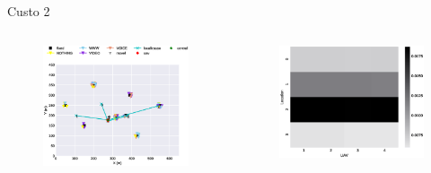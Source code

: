 \begin{frame}{Custo 2}
        \begin{columns}
            \begin{column}{0.65\textwidth}
               \begin{figure}[!htb]
                    \includegraphics[width=\textwidth]{custo_2/0_uav_loc.eps}
                \end{figure}
            \end{column}
            \begin{column}{0.45\textwidth}
               \begin{figure}[!htb]
                    \includegraphics[width=\textwidth]{custo_2/0_bij_.eps}

\end{figure}
\end{column}
\end{columns}
\end{frame}

